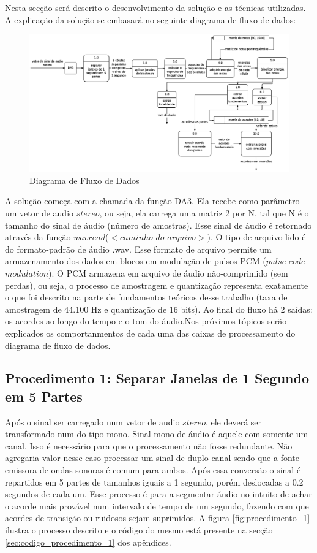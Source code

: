 Nesta secção será descrito o desenvolvimento da solução e as técnicas utilizadas. A explicação da solução se embasará no seguinte diagrama de fluxo de dados:

\begin{figure}[h]
	\centering
		\includegraphics[keepaspectratio=true,scale=0.51]{figuras/dfd_2.eps}
	\caption{Diagrama de Fluxo de Dados}
\end{figure}

A solução começa com a chamada da função DA3. Ela recebe como parâmetro um vetor de audio $stereo$, ou seja, ela carrega uma matriz 2 por N, tal que N é o tamanho do sinal de áudio (número de amostras). Esse sinal de áudio é retornado através da função $wavread$($<$$caminho$ $do$ $arquivo$$>$$)$. O tipo de arquivo lido é do formato-padrão de áudio .wav. Esse formato de arquivo permite um armazenamento dos dados em blocos em modulação de pulsos PCM ($pulse$-$code$-$modulation$). O PCM armazena em arquivo de áudio não-comprimido (sem perdas), ou seja, o processo de amostragem e quantização representa exatamente o que foi descrito na parte de fundamentos teóricos desse trabalho (taxa de amostragem de 44.100 Hz e quantização de 16 bits). Ao final do fluxo há 2 saídas: os acordes ao longo do tempo e o tom do áudio.Nos próximos tópicos serão explicados os comportanmentos de cada uma das caixas de processamento do diagrama de fluxo de dados.

\subsection{Procedimento 1: Separar Janelas de 1 Segundo em 5 Partes}
\label{subsec:procedimento_1}

Após o sinal ser carregado num vetor de audio $stereo$, ele deverá ser transformado num do tipo mono. Sinal mono de áudio é aquele com somente um canal. Isso é necessário para que o processamento não fosse redundante. Não agregaria valor nesse caso processar um sinal de duplo canal sendo que a fonte emissora de ondas sonoras é comum para ambos. Após essa conversão o sinal é repartidos em 5 partes de tamanhos iguais a 1 segundo, porém deslocadas a 0.2 segundos de cada um. Esse processo é para a segmentar áudio no intuito de achar o acorde mais provável num intervalo de tempo de um segundo, fazendo com que acordes de transição ou ruidosos sejam suprimidos. A figura \ref{fig:procedimento_1} ilustra o processo descrito e o código do mesmo está presente na secção \ref{sec:codigo_procedimento_1} dos apêndices.

